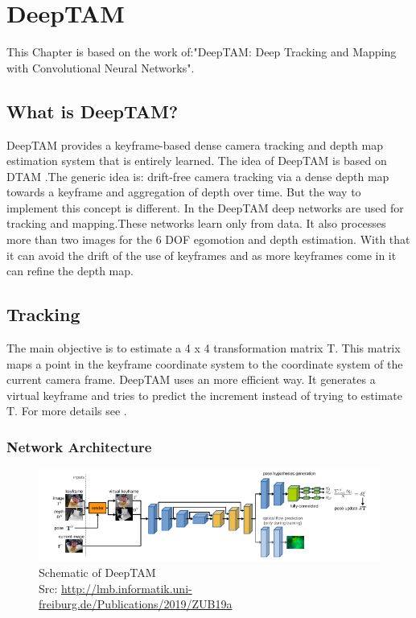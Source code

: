 \chapter{DeepTAM\authorB}

This Chapter is based on the work of:"DeepTAM: Deep Tracking and Mapping with Convolutional Neural Networks".\cite{ZUB19a}

\section{What is DeepTAM?}
DeepTAM provides a keyframe-based dense camera tracking and depth map estimation system that is entirely learned. The idea of DeepTAM is based on DTAM \cite{dtam}.The generic idea is: drift-free camera tracking via a dense depth map towards a keyframe and aggregation of depth over time. But the way to implement this concept is different. In the DeepTAM deep networks are used for tracking and mapping.These networks learn only from data. It also processes more than two images for the 6 DOF egomotion and depth estimation. With that it can avoid the drift of the use of keyframes and as more keyframes come in it can refine the depth map.

\section{Tracking}
The main objective is to estimate a 4 x 4 transformation matrix T. This matrix maps a point in the keyframe coordinate system to the coordinate system of the current camera frame. DeepTAM uses an more efficient way. It generates a virtual keyframe and tries to predict the increment instead of trying to estimate T. For more details see \cite{ZUB19a}. 

\subsection{Network Architecture}

\begin{figure}[h]
	\centering
	\includegraphics[width=1.1\textwidth]{./media/images/DeepTAM_schematic.PNG}
  	\caption{Schematic of DeepTAM
  	\\Src: \url{http://lmb.informatik.uni-freiburg.de/Publications/2019/ZUB19a}}
  	\label{DeepTAMschematic}
\end{figure}

